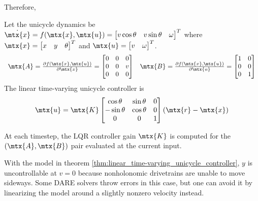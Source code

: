 Therefore,
\begin{theorem}
  \label{thm:linear_time-varying_unicycle_controller}

  Let the unicycle dynamics be
  $\dot{\mtx{x}} = f(\mtx{x}, \mtx{u}) =
  \begin{bmatrix}
    v\cos\theta &
    v\sin\theta &
    \omega
  \end{bmatrix}^T$ where
  $\mtx{x} =
  \begin{bmatrix}
    x &
    y &
    \theta
  \end{bmatrix}^T$ and
  $\mtx{u} =
  \begin{bmatrix}
    v &
    \omega
  \end{bmatrix}^T$.
  \begin{equation}
    \begin{array}{cc}
      \mtx{A} = \frac{\partial f(\mtx{x}, \mtx{u})}{\partial\mtx{x}} =
      \begin{bmatrix}
        0 & 0 & 0 \\
        0 & 0 & v \\
        0 & 0 & 0
      \end{bmatrix} &
      \mtx{B} = \frac{\partial f(\mtx{x}, \mtx{u})}{\partial\mtx{u}} =
      \begin{bmatrix}
        1 & 0 \\
        0 & 0 \\
        0 & 1
      \end{bmatrix}
    \end{array}
  \end{equation}
  The linear time-varying unicycle controller is
  \begin{equation}
    \mtx{u} = \mtx{K}
    \begin{bmatrix}
      \cos\theta & \sin\theta & 0 \\
      -\sin\theta & \cos\theta & 0 \\
      0 & 0 & 1
    \end{bmatrix}
    (\mtx{r} - \mtx{x})
  \end{equation}

  At each timestep, the LQR controller gain $\mtx{K}$ is computed for the
  $(\mtx{A}, \mtx{B})$ pair evaluated at the current input.
\end{theorem}

With the \gls{model} in theorem
\ref{thm:linear_time-varying_unicycle_controller}, $y$ is uncontrollable at
$v = 0$ because nonholonomic drivetrains are unable to move sideways. Some DARE
solvers throw errors in this case, but one can avoid it by linearizing the model
around a slightly nonzero velocity instead.

